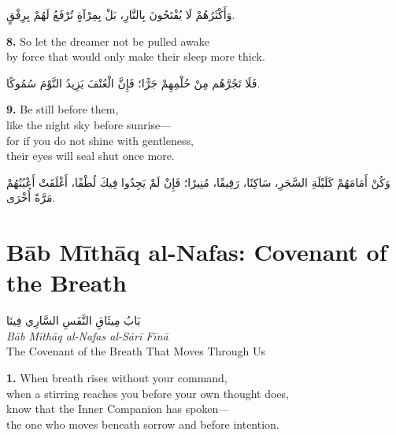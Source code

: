 \documentclass[11pt,a4paper,twoside]{book}
\begin{document}
\begin{flushright}
{\arabicfont
وَأَكْثَرُهُمْ لَا يُفْتَحُونَ بِالنَّارِ،
بَلْ بِمِرْآةٍ تُرْفَعُ لَهُمْ بِرِفْقٍ.}
\end{flushright}

\vspace{1em}
{\color{indigo}\bfseries 8.}\quad
So let the dreamer not be pulled awake\\
by force that would only make their sleep more thick.

\begin{flushright}
{\arabicfont
فَلَا تَجُرَّهُم مِنْ حُلْمِهِمْ جَرًّا؛
فَإِنَّ الْعُنْفَ يَزِيدُ النَّوْمَ سُمُوكًا.}
\end{flushright}

\vspace{1em}
{\color{indigo}\bfseries 9.}\quad
Be still before them,\\
like the night sky before sunrise—\\
for if you do not shine with gentleness,\\
their eyes will seal shut once more.

\begin{flushright}
{\arabicfont
وَكُنْ أَمَامَهُمْ كَلَيْلَةِ السَّحَرِ،
سَاكِنًا، رَقِيقًا، مُنِيرًا؛
فَإِنْ لَمْ يَجِدُوا فِيكَ لُطْفًا،
أَغْلَقَتْ أَعْيُنُهُمْ مَرَّةً أُخْرَى.}
\end{flushright}

\clearpage


\chapter*{Bāb Mīthāq al-Nafas: Covenant of the Breath}
\begin{center}
{\arabicfont\Large بَابُ مِيثَاقِ النَّفَسِ السَّارِي فِينَا}\\[5pt]
{\small\itshape Bāb Mīthāq al-Nafas al-Sārī Fīnā}\\[3pt]
{\small The Covenant of the Breath That Moves Through Us}
\end{center}
\vspace{1em}

{\color{indigo}\bfseries 1.}\quad
When breath rises without your command,\\
when a stirring reaches you before your own thought does,\\
know that the Inner Companion has spoken—\\
the one who moves beneath sorrow and before intention.
\end{document}
